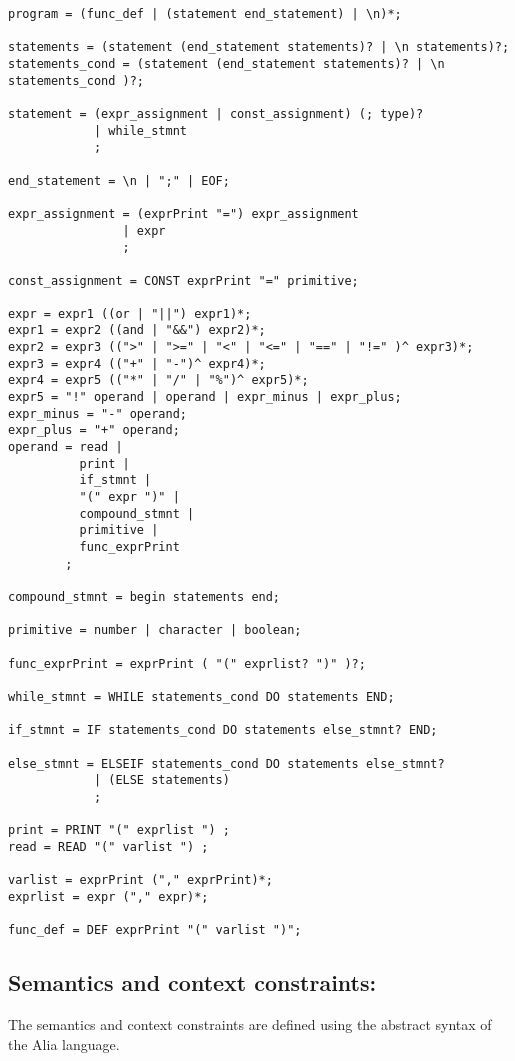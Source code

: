 \documentclass[paper=a4, fontsize=11pt]{article}
\numberwithin{equation}{section}		%
\numberwithin{figure}{section}			%
\numberwithin{table}{section}				%
\begin{document}
\begin{verbatim}
program = (func_def | (statement end_statement) | \n)*;

statements = (statement (end_statement statements)? | \n statements)?;
statements_cond = (statement (end_statement statements)? | \n statements_cond )?;

statement = (expr_assignment | const_assignment) (; type)?
			| while_stmnt 
			;

end_statement = \n | ";" | EOF;

expr_assignment = (exprPrint "=") expr_assignment
				| expr 
				;

const_assignment = CONST exprPrint "=" primitive;

expr = expr1 ((or | "||") expr1)*;
expr1 = expr2 ((and | "&&") expr2)*;
expr2 = expr3 ((">" | ">=" | "<" | "<=" | "==" | "!=" )^ expr3)*;
expr3 = expr4 (("+" | "-")^ expr4)*;
expr4 = expr5 (("*" | "/" | "%")^ expr5)*;
expr5 = "!" operand | operand | expr_minus | expr_plus;
expr_minus = "-" operand;
expr_plus = "+" operand;
operand = read |
	   	  print |
	   	  if_stmnt |
	   	  "(" expr ")" |
	   	  compound_stmnt |
	   	  primitive |
	   	  func_exprPrint
		;
		  
compound_stmnt = begin statements end;

primitive = number | character | boolean;

func_exprPrint = exprPrint ( "(" exprlist? ")" )?;

while_stmnt = WHILE statements_cond DO statements END;

if_stmnt = IF statements_cond DO statements else_stmnt? END;

else_stmnt = ELSEIF statements_cond DO statements else_stmnt?
			| (ELSE statements)
			;

print = PRINT "(" exprlist ") ;
read = READ "(" varlist ") ;

varlist = exprPrint ("," exprPrint)*;
exprlist = expr ("," expr)*;

func_def = DEF exprPrint "(" varlist ")";
\end{verbatim}


\subsection{Semantics and context constraints:}
The semantics and context constraints are defined using the abstract syntax of the Alia language.
\end{document}
